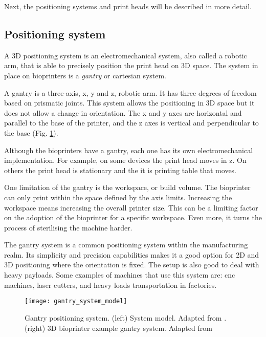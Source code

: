 Next, the positioning systems and print heads will be described in more detail.

\subsection{Positioning system}
\label{subsec:positioning_system}

A 3D positioning system is an electromechanical system, also called a robotic arm, that is able to precisely position the print head on 3D space. The system in place on bioprinters is a \emph{gantry} or cartesian system.

A gantry is a three-axis, x, y and z, robotic arm. It has three degrees of freedom based on prismatic joints. This system allows the positioning in 3D space but it does not allow a change in orientation. The x and y axes are horizontal and parallel to the base of the printer, and the z axes is vertical and perpendicular to the base (Fig. \ref{fig:gantry_system}).

Although the bioprinters have a gantry, each one has its own electromechanical implementation. For example, on some devices the print head moves in z. On others the print head is stationary and the it is printing table that moves.

One limitation of the gantry is the workspace, or build volume. The bioprinter can only print within the space defined by the axis limits. Increasing the workspace means increasing the overall printer size. This can be a limiting factor on the adoption of the bioprinter for a specific workspace. Even more, it turns the process of sterilising the machine harder. 

The gantry system is a common positioning system within the manufacturing realm. Its simplicity and precision capabilities makes it a good option for 2D and 3D positioning where the orientation is fixed. The setup is also good to deal with heavy payloads. Some examples of machines that use this system are: \gls{cnc} machines, laser cutters, and heavy loads transportation in factories.

\begin{figure}[htbp]
	\centering
	\texttt{[image: gantry\_system\_model]}
	\hspace{.1in}
	\caption{Gantry positioning system. (left) System model. Adapted from \cite{Siciliano2009_robotics_modelling_planning_control}. (right) 3D bioprinter example gantry system. Adapted from \cite{ONeill2017_3d_bioprinting_directly_onto_moving_human_anatomy}}
	\label{fig:gantry_system}
\end{figure}

